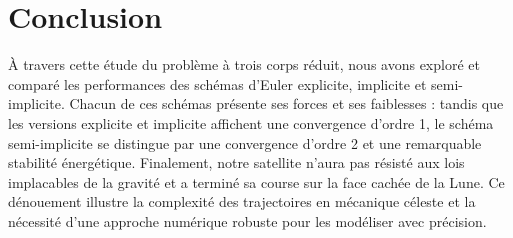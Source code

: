 \documentclass[a4paper,12pt,twoside]{article}
\begin{document}
\section{Conclusion}

À travers cette étude du problème à trois corps réduit, nous avons exploré et comparé les performances des schémas d’Euler explicite, implicite et semi-implicite. Chacun de ces schémas présente ses forces et ses faiblesses : tandis que les versions explicite et implicite affichent une convergence d’ordre 1, le schéma semi-implicite se distingue par une convergence d’ordre 2 et une remarquable stabilité énergétique. Finalement, notre satellite n’aura pas résisté aux lois implacables de la gravité et a terminé sa course sur la face cachée de la Lune. Ce dénouement illustre la complexité des trajectoires en mécanique céleste et la nécessité d’une approche numérique robuste pour les modéliser avec précision.
\end{document}

